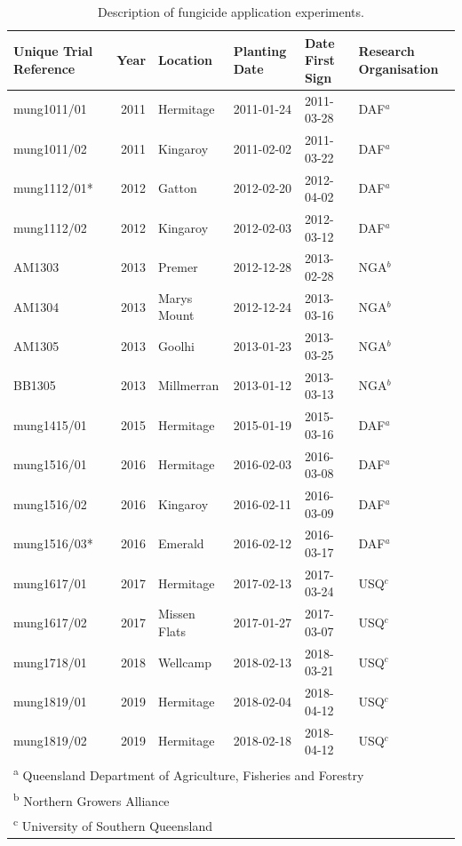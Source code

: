 \documentclass[agronomy,article,submit,moreauthors,pdftex]{mdpi}
\begin{document}
\begin{table}

\caption{\label{tab:Table1_ExperimentalDetail}Description of fungicide application experiments.}
\centering
\begin{tabular}[t]{lrllll}
\toprule
Unique Trial Reference & Year & Location & Planting Date & Date First Sign & Research Organisation\\
\midrule
mung1011/01 & 2011 & Hermitage & 2011-01-24 & 2011-03-28 & DAF$^{a}$\\
mung1011/02 & 2011 & Kingaroy & 2011-02-02 & 2011-03-22 & DAF$^{a}$\\
mung1112/01* & 2012 & Gatton & 2012-02-20 & 2012-04-02 & DAF$^{a}$\\
mung1112/02 & 2012 & Kingaroy & 2012-02-03 & 2012-03-12 & DAF$^{a}$\\
AM1303 & 2013 & Premer & 2012-12-28 & 2013-02-28 & NGA$^{b}$\\
\addlinespace
AM1304 & 2013 & Marys Mount & 2012-12-24 & 2013-03-16 & NGA$^{b}$\\
AM1305 & 2013 & Goolhi & 2013-01-23 & 2013-03-25 & NGA$^{b}$\\
BB1305 & 2013 & Millmerran & 2013-01-12 & 2013-03-13 & NGA$^{b}$\\
mung1415/01 & 2015 & Hermitage & 2015-01-19 & 2015-03-16 & DAF$^{a}$\\
mung1516/01 & 2016 & Hermitage & 2016-02-03 & 2016-03-08 & DAF$^{a}$\\
\addlinespace
mung1516/02 & 2016 & Kingaroy & 2016-02-11 & 2016-03-09 & DAF$^{a}$\\
mung1516/03* & 2016 & Emerald & 2016-02-12 & 2016-03-17 & DAF$^{a}$\\
mung1617/01 & 2017 & Hermitage & 2017-02-13 & 2017-03-24 & USQ$^{c}$\\
mung1617/02 & 2017 & Missen Flats & 2017-01-27 & 2017-03-07 & USQ$^{c}$\\
mung1718/01 & 2018 & Wellcamp & 2018-02-13 & 2018-03-21 & USQ$^{c}$\\
\addlinespace
mung1819/01 & 2019 & Hermitage & 2018-02-04 & 2018-04-12 & USQ$^{c}$\\
mung1819/02 & 2019 & Hermitage & 2018-02-18 & 2018-04-12 & USQ$^{c}$\\
\bottomrule
\multicolumn{6}{l}{\textsuperscript{a} Queensland Department of Agriculture, Fisheries and Forestry}\\
\multicolumn{6}{l}{\textsuperscript{b} Northern Growers Alliance}\\
\multicolumn{6}{l}{\textsuperscript{c} University of Southern Queensland}\\
\end{tabular}
\end{table}
\end{document}
